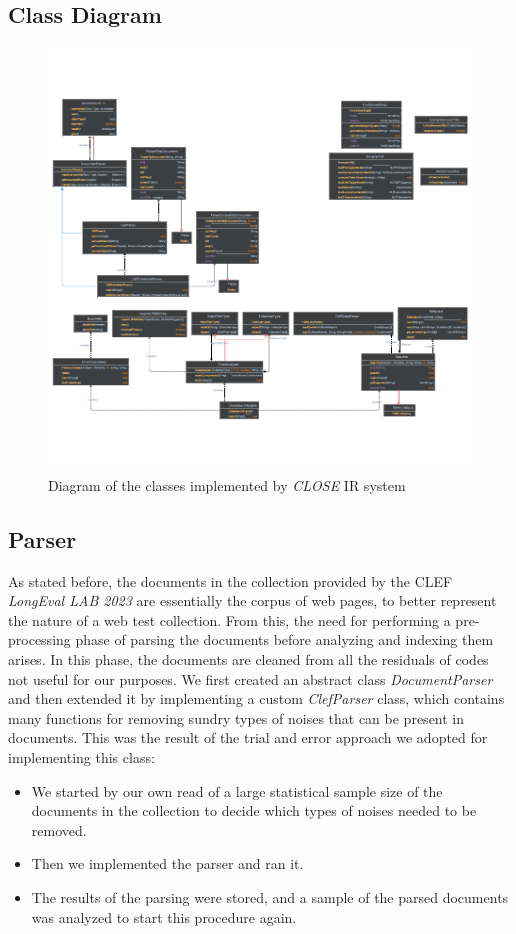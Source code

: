 \newpage
\enlargethispage{5\baselineskip}
\subsection{Class Diagram}

\begin{figure}[!h]
    \centering
    \includegraphics[height=0.7\textheight, angle =90, keepaspectratio]{figure/Classes_diagram_white.pdf}
    \caption{Diagram of the classes implemented by \textit{CLOSE} \ac{IR} system}
    \label{fig:Classes_diagram_white}
\end{figure}
\clearpage

\subsection{Parser} \label{parser_subsec}
As stated before, the documents in the collection provided by the \ac{CLEF} \textit{LongEval LAB 2023} \cite{cleflongeval} are essentially the corpus of web pages, to better represent the nature of a web test collection.
From this, the need for performing a pre-processing phase of parsing the documents before analyzing and indexing them arises.
In this phase, the documents are cleaned from all the residuals of codes not useful for our purposes. 
We first created an abstract class \textit{DocumentParser} and then extended it by implementing a custom \textit{ClefParser} class, which contains many functions for removing sundry types of noises that can be present in documents. 
This was the result of the trial and error approach we adopted for implementing this class:
\begin{itemize}
\item We started by our own read of a large statistical sample size of the documents in the collection to decide which types of noises needed to be removed.
\item Then we implemented the parser and ran it.
\item The results of the parsing were stored, and a sample of the parsed documents was analyzed to start this procedure again.
\end{itemize}

